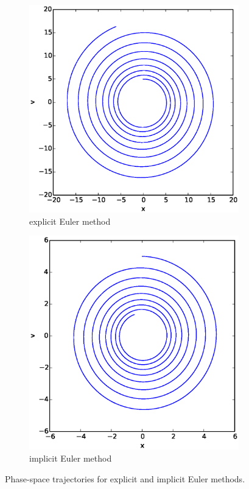 \documentclass{article}
\theoremstyle{definition}
\renewcommand{\>}{\rangle}
\newcommand{\<}{\langle}
\begin{document}
\begin{figure}\centering
\begin{subfigure}{0.48\textwidth}
\includegraphics[width=\textwidth]{explicit_xv.eps}
\caption{explicit Euler method}
\end{subfigure}
\begin{subfigure}{0.48\textwidth}
\includegraphics[width=\textwidth]{implicit_xv.eps}
\caption{implicit Euler method}
\end{subfigure}
\caption{\label{fig:Euler_xv}Phase-space trajectories for explicit and implicit
Euler methods.}
\end{figure}
\end{document}
